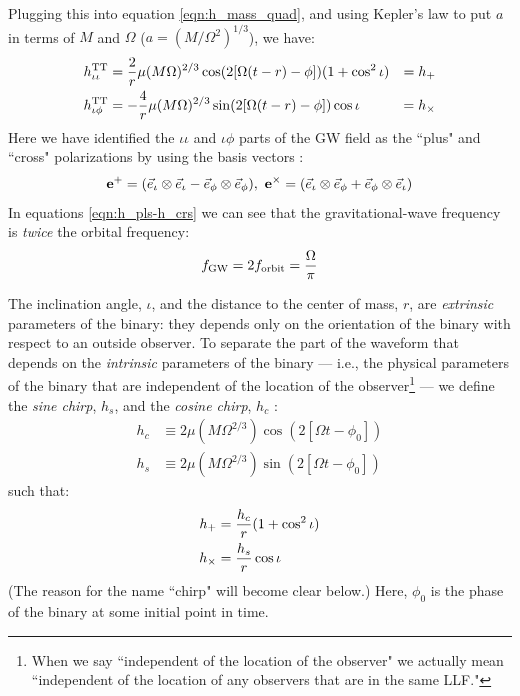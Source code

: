 Plugging this into equation \ref{eqn:h_mass_quad}, and using Kepler's law to put $a$ in terms of $M$ and $\Omega$ ($a = \left(M/\Omega^2\right)^{1/3}$), we have:
\begin{subequations}
\label{eqn:h_pls-h_crs}
\begin{align}
h^{\mathrm{TT}}_{\iota\iota} &= \frac{2}{r}\mu (M \Omega)^{2/3} \cos(2[\Omega (t-r) - \phi])(1 + \cos^2\iota) &= h_{+} \\
h^{\mathrm{TT}}_{\iota\phi}  &= -\frac{4}{r} \mu (M\Omega)^{2/3} \sin(2[\Omega (t-r) - \phi])\cos\iota &= h_{\times}
\end{align}
\end{subequations}
Here we have identified the $\iota\iota$ and $\iota\phi$ parts of the \ac{GW} field as the ``plus" and ``cross" polarizations by using the basis vectors \cite{ref:BlanfordThorne}:
\begin{equation}
\mathbf{e}^{+} = (\vec{e}_{\iota} \otimes \vec{e}_{\iota} - \vec{e}_{\phi} \otimes \vec{e}_{\phi}), ~ \mathbf{e}^{\times} = (\vec{e}_{\iota} \otimes \vec{e}_{\phi} + \vec{e}_{\phi} \otimes \vec{e}_{\iota})
\end{equation}
In equations \ref{eqn:h_pls-h_crs} we can see that the gravitational-wave frequency is \emph{twice} the orbital frequency:
\begin{equation}
\label{eqn:f_GW}
\fGW = 2 f_{\mathrm{orbit}} = \frac{\Omega}{\pi}
\end{equation}

The inclination angle, $\iota$, and the distance to the center of mass, $r$, are \emph{extrinsic} parameters of the binary: they depends only on the orientation of the binary with respect to an outside observer. To separate the part of the waveform that depends on the \emph{intrinsic} parameters of the binary --- i.e., the physical parameters of the binary that are independent of the location of the observer\footnote{When we say ``independent of the location of the observer" we actually mean ``independent of the location of any observers that are in the same \ac{LLF}."} --- we define the \emph{sine chirp}, $h_s$, and the \emph{cosine chirp}, $h_c$ \cite{ref:Brown}:
\begin{subequations}
\label{eqn:cos_sin_chirp}
\begin{align}
h_c &\equiv 2 \mu (M \Omega^{2/3}) \cos(2[\Omega t - \phi_0] ) \\
h_s &\equiv 2 \mu (M \Omega^{2/3}) \sin(2[\Omega t - \phi_0] )
\end{align}
\end{subequations}
such that:
\begin{subequations}
\label{eqn:hpls_hcrs}
\begin{align}
h_{+} &= \frac{h_c}{r} (1 + \cos^2\iota) \\
h_{\times} &= \frac{h_s}{r} \cos\iota
\end{align}
\end{subequations}
(The reason for the name ``chirp" will become clear below.) Here, $\phi_0$ is the phase of the binary at some initial point in time.

